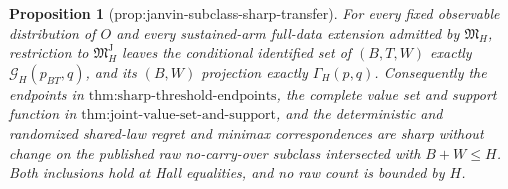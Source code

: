 \documentclass{article}
\newtheorem{proposition}{Proposition}
\begin{document}
\begin{proposition}[prop:janvin-subclass-sharp-transfer]\label{prop:janvin-subclass-sharp-transfer}
For every fixed observable distribution of \(O\) and every sustained-arm full-data extension admitted by \(\mathfrak M_H\), restriction to \(\mathfrak M_H^{\mathrm J}\) leaves the conditional identified set of \((B,T,W)\) exactly \(\mathcal G_H(p_{BT},q)\), and its \((B,W)\) projection exactly \(\Gamma_H(p,q)\). Consequently the endpoints in \(\text{thm:sharp-threshold-endpoints}\), the complete value set and support function in \(\text{thm:joint-value-set-and-support}\), and the deterministic and randomized shared-law regret and minimax correspondences are sharp without change on the published raw no-carry-over subclass intersected with \(B+W\le H\). Both inclusions hold at Hall equalities, and no raw count is bounded by \(H\).
\end{proposition}
\end{document}
